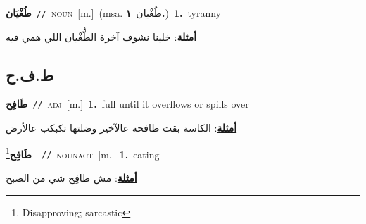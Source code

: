 \documentclass[10pt,a4paper,twoside]{article} %
\begin{document}
\begin{multicols}{2}
{\setlength\topsep{0pt}\textbf{\foreignlanguage{arabic}{طُغْيَان}}\ {\color{gray}\texttt{//}\color{black}}\ \textsc{noun}\ [m.]\ \color{gray}(msa. \foreignlanguage{arabic}{طُغْيان}~\foreignlanguage{arabic}{\textbf{١.}})\color{black}\ \textbf{1.}~tyranny\  \begin{flushright}\color{gray}\foreignlanguage{arabic}{\textbf{\underline{\foreignlanguage{arabic}{أمثلة}}}: خلينا نشوف آخرة الطُّغْيان اللي همي فيه}\end{flushright}\color{black}} \vspace{2mm}

\vspace{-3mm}
\subsection*{\color{blue}\foreignlanguage{arabic}{ط.ف.ح}\color{blue}{}} 

{\setlength\topsep{0pt}\textbf{\foreignlanguage{arabic}{طَافِح}}\ {\color{gray}\texttt{//}\color{black}}\ \textsc{adj}\ [m.]\ \textbf{1.}~full until it overflows or spills over\  \begin{flushright}\color{gray}\foreignlanguage{arabic}{\textbf{\underline{\foreignlanguage{arabic}{أمثلة}}}: الكاسة بقت طافحة عالآخير وضلتها تكبكب عالأرض}\end{flushright}\color{black}} \vspace{2mm}

{\setlength\topsep{0pt}\textbf{\foreignlanguage{arabic}{طَافِح}}\footnote{Disapproving; sarcastic}\ \ {\color{gray}\texttt{//}\color{black}}\ \textsc{noun\textunderscore act}\ [m.]\ \textbf{1.}~eating\  \begin{flushright}\color{gray}\foreignlanguage{arabic}{\textbf{\underline{\foreignlanguage{arabic}{أمثلة}}}: مش طافِح شي من الصبح}\end{flushright}\color{black}} \vspace{2mm}


\end{multicols}
\end{document}
